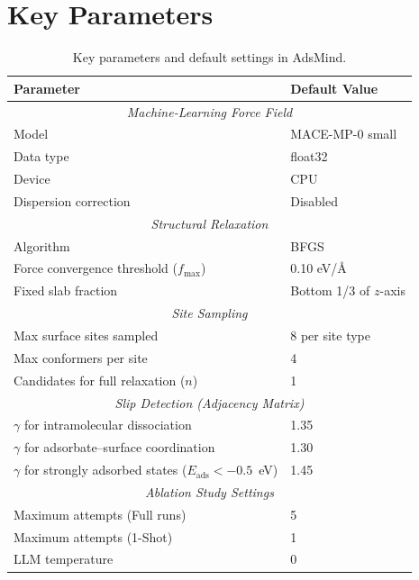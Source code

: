 \documentclass[%
 preprint,
 superscriptaddress,
 amsmath,amssymb,
 aps,
 prb,
 floatfix,
]{revtex4-2}
\begin{document}
\section{Key Parameters}
\label{sec:si-parameters}

\begin{table}[ht]
\centering
\caption{Key parameters and default settings in AdsMind.}
\label{tab:si-parameters}
\begin{tabular}{ll}
\hline
\textbf{Parameter} & \textbf{Default Value} \\
\hline
\multicolumn{2}{c}{\textit{Machine-Learning Force Field}} \\
\hline
Model & MACE-MP-0 small \\
Data type & float32 \\
Device & CPU \\
Dispersion correction & Disabled \\
\hline
\multicolumn{2}{c}{\textit{Structural Relaxation}} \\
\hline
Algorithm & BFGS \\
Force convergence threshold ($f_{\text{max}}$) & 0.10 eV/\AA \\
Fixed slab fraction & Bottom 1/3 of $z$-axis \\
\hline
\multicolumn{2}{c}{\textit{Site Sampling}} \\
\hline
Max surface sites sampled & 8 per site type \\
Max conformers per site & 4 \\
Candidates for full relaxation ($n$) & 1 \\
\hline
\multicolumn{2}{c}{\textit{Slip Detection (Adjacency Matrix)}} \\
\hline
$\gamma$ for intramolecular dissociation & 1.35 \\
$\gamma$ for adsorbate--surface coordination & 1.30 \\
$\gamma$ for strongly adsorbed states ($E_{\text{ads}} < -0.5$~eV) & 1.45 \\
\hline
\multicolumn{2}{c}{\textit{Ablation Study Settings}} \\
\hline
Maximum attempts (Full runs) & 5 \\
Maximum attempts (1-Shot) & 1 \\
LLM temperature & 0 \\
\hline
\end{tabular}
\end{table}
\end{document}
